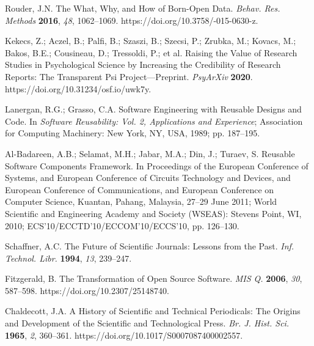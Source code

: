 \documentclass[psych,tutorial,accept,moreauthors,pdftex]{Definitions/mdpi}
\begin{document}
\begin{thebibliography}{999}
Rouder, J.N. The What, Why, and How of Born-Open Data. \emph{Behav. Res. Methods} \textbf{2016}, \emph{48}, 1062--1069. https://doi.org/10.3758/-015-0630-z.


Kekecs, Z.; Aczel, B.; Palfi, B.; Szaszi, B.; Szecsi, P.; Zrubka, M.; Kovacs, M.; Bakos, B.E.; Cousineau, D.; Tressoldi, P.; et al. Raising the Value of Research Studies in Psychological Science by Increasing the Credibility of Research Reports: The Transparent Psi Project—Preprint. \emph{PsyArXiv} \textbf{2020}. https://doi.org/10.31234/osf.io/uwk7y.


Lanergan, R.G.; Grasso, C.A. Software Engineering with Reusable Designs and Code. In \emph{Software Reusability: Vol. 2, Applications and Experience}; Association for Computing Machinery: New York, NY, USA, 1989; pp. 187--195.


Al-Badareen, A.B.; Selamat, M.H.; Jabar, M.A.; Din, J.; Turaev, S. Reusable Software Components Framework. In Proceedings of the European Conference of Systems, and European Conference of Circuits Technology and Devices, and European Conference of Communications, and European Conference on Computer Science, Kuantan, Pahang, Malaysia, 27--29 June 2011; World Scientific and Engineering Academy and Society (WSEAS): Stevens Point, WI, 2010; ECS’10/ECCTD’10/ECCOM’10/ECCS’10, pp. 126--130.


Schaffner, A.C. The Future of Scientific Journals: Lessons from the Past. \emph{Inf. Technol. Libr.} \textbf{1994}, \emph{13}, 239--247.


Fitzgerald, B. The Transformation of Open Source Software. \emph{MIS Q.} \textbf{2006}, \emph{30}, 587--598. https://doi.org/10.2307/25148740.


Chaldecott, J.A. A History of Scientific and Technical Periodicals: The Origins and Development of the Scientific and Technological Press. \emph{Br. J. Hist. Sci.} \textbf{1965}, \emph{2}, 360--361. https://doi.org/10.1017/S0007087400002557.


\end{thebibliography}
\end{document}
